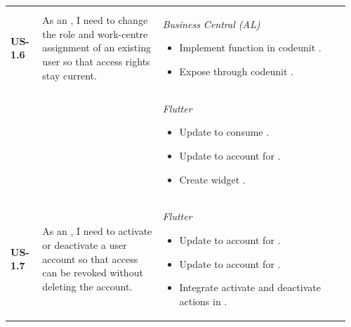 \begin{longtable}{@{} P{0.09\linewidth} P{0.34\linewidth} P{0.53\linewidth} @{}}
	\midrule
	\textbf{US-1.6}
	& As an , I need to change the role and work-centre
	assignment of an existing user so that access rights stay current.
	& \noindent\textit{Business Central (AL)}
	\begin{itemize}[nosep, leftmargin=*]
		\item Implement function  in codeunit .
		\item Expose  through codeunit .
	\end{itemize}
\\ & &
	\noindent\textit{Flutter}
	\begin{itemize}[nosep, leftmargin=*]
		\item Update  to consume .
		\item Update  to account for .
		\item Create widget .
	\end{itemize}\\
	\midrule
	\textbf{US-1.7}
	& As an , I need to activate or deactivate a user
	account so that access can be revoked without deleting the account.
	& \noindent\textit{Flutter}
	\begin{itemize}[nosep, leftmargin=*]
		\item Update  to account for .
		\item Update  to account for .
		\item Integrate activate and deactivate actions in .
\end{itemize}\\
\midrule


\end{longtable}
